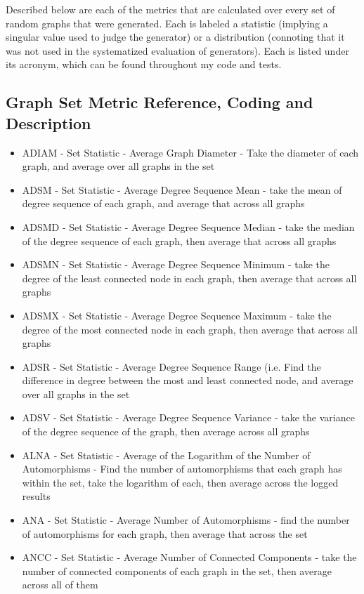 Described below are each of the metrics that are calculated over every set of random graphs that were generated.
Each is labeled a statistic (implying a singular value used to judge the generator) or a distribution (connoting that it was not used in the systematized evaluation of generators).
Each is listed under its acronym, which can be found throughout my code and tests. 

\subsection{Graph Set Metric Reference, Coding and Description}

\begin{itemize}

\item{ADIAM - Set Statistic - Average Graph Diameter - Take the diameter of each graph, and average over all graphs in the set}
\item{ADSM - Set Statistic - Average Degree Sequence Mean - take the mean of degree sequence of each graph, and average that across all graphs}
\item{ADSMD - Set Statistic - Average Degree Sequence Median - take the median of the degree sequence of each graph, then average that across all graphs}
\item{ADSMN - Set Statistic - Average Degree Sequence Minimum - take the degree of the least connected node in each graph, then average that across all graphs}
\item{ADSMX - Set Statistic - Average Degree Sequence Maximum - take the degree of the most connected node in each graph, then average that across all graphs}
\item{ADSR - Set Statistic - Average Degree Sequence Range  (i.e. Find the difference in degree between the most and least connected node, and average over all graphs in the set}
\item{ADSV - Set Statistic - Average Degree Sequence Variance - take the variance of the degree sequence of the graph, then average across all graphs}
\item{ALNA - Set Statistic - Average of the Logarithm of the Number of Automorphisms - Find the number of automorphisms that each graph has within the set, take the logarithm of each, then average across the logged results}
\item{ANA - Set Statistic - Average Number of Automorphisms - find the number of automorphisms for each graph, then average that across the set}
\item{ANCC - Set Statistic - Average Number of Connected Components - take the number of connected components of each graph in the set, then average across all of them}

\end{itemize}
